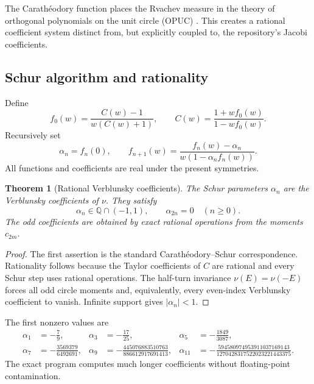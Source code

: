 \documentclass[11pt,oneside]{article}
\newtheorem{theorem}{Theorem}[section]
\theoremstyle{definition}
\begin{document}
The Carath\'eodory function places the Rvachev measure in the theory of orthogonal
polynomials on the unit circle (OPUC) \cite{p4:SimonOPUC1,p4:SimonOneFoot}. This creates a rational
coefficient system distinct from, but explicitly coupled to, the repository's Jacobi
coefficients.

\subsection{Schur algorithm and rationality}

Define
\begin{equation}
 f_0(w)=\frac{C(w)-1}{w(C(w)+1)},
 \qquad C(w)=\frac{1+wf_0(w)}{1-wf_0(w)}.
 \label{p4:eq:Schur-first}
\end{equation}
Recursively set
\begin{equation}
 \alpha_n=f_n(0),\qquad
 f_{n+1}(w)=\frac{f_n(w)-\alpha_n}{w(1-\alpha_nf_n(w))}.
 \label{p4:eq:Schur-recursion}
\end{equation}
All functions and coefficients are real under the present symmetries.

\begin{theorem}[Rational Verblunsky coefficients]
\label{p4:thm:rational-alpha}
The Schur parameters \(\alpha_n\) are the Verblunsky coefficients of \(\nu\). They satisfy
\begin{equation}
 \alpha_n\in\mathbb Q\cap(-1,1),\qquad \alpha_{2n}=0\quad(n\ge0).
 \label{p4:eq:alpha-rational-parity}
\end{equation}
The odd coefficients are obtained by exact rational operations from the moments \(c_{2m}\).
\end{theorem}

\begin{proof}
The first assertion is the standard Carath\'eodory--Schur correspondence. Rationality follows
because the Taylor coefficients of \(C\) are rational and every Schur step uses rational
operations. The half-turn invariance \(\nu(E)=\nu(-E)\) forces all odd circle moments and,
equivalently, every even-index Verblunsky coefficient to vanish. Infinite support gives
\(|\alpha_n|<1\).
\end{proof}

The first nonzero values are
\begin{align*}
 \alpha_1&=-\frac79,&
 \alpha_3&=-\frac{17}{25},&
 \alpha_5&=-\frac{1849}{3087},\\
 \alpha_7&=-\frac{3569379}{6492691},&
 \alpha_9&=-\frac{445076883510763}{886612917691413},&
 \alpha_{11}&=-\frac{594580974953911037169143}{1270428317522023221443375}.
\end{align*}
The exact program computes much longer coefficients without floating-point contamination.
\end{document}
